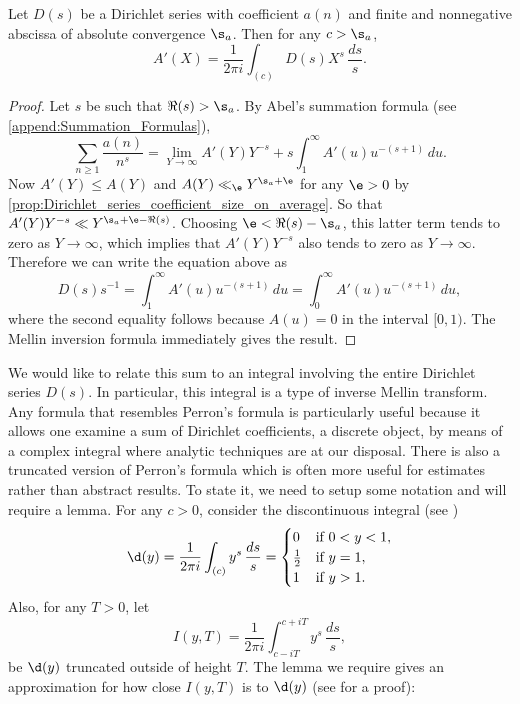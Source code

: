     \begin{theorem}
      Let $D(s)$ be a Dirichlet series with coefficient $a(n)$ and finite and nonnegative abscissa of absolute convergence $\s_{a}$. Then for any $c > \s_{a}$,
      \[
        A'(X) = \frac{1}{2\pi i}\int_{(c)}D(s)X^{s}\,\frac{ds}{s}.
      \]
    \end{theorem}
    \begin{proof}
      Let $s$ be such that $\Re(s) > \s_{a}$. By Abel's summation formula (see \cref{append:Summation_Formulas}),
      \[
        \sum_{n \ge 1}\frac{a(n)}{n^{s}} = \lim_{Y \to \infty}A'(Y)Y^{-s}+s\int_{1}^{\infty}A'(u)u^{-(s+1)}\,du.
      \]
      Now $A'(Y) \le A(Y)$ and $A(Y) \ll_{\e} Y^{\s_{a}+\e}$ for any $\e > 0$ by \cref{prop:Dirichlet_series_coefficient_size_on_average}. So that $A'(Y)Y^{-s} \ll Y^{\s_{a}+\e-\Re(s)}$. Choosing $\e < \Re(s)-\s_{a}$, this latter term tends to zero as $Y \to \infty$, which implies that $A'(Y)Y^{-s}$ also tends to zero as $Y \to \infty$. Therefore we can write the equation above as
      \[
        D(s)s^{-1} = \int_{1}^{\infty}A'(u)u^{-(s+1)}\,du = \int_{0}^{\infty}A'(u)u^{-(s+1)}\,du,
      \]
      where the second equality follows because $A(u) = 0$ in the interval $[0,1)$. The Mellin inversion formula immediately gives the result.
    \end{proof}

    We would like to relate this sum to an integral involving the entire Dirichlet series $D(s)$. In particular, this integral is a type of inverse Mellin transform. Any formula that resembles Perron's formula is particularly useful because it allows one examine a sum of Dirichlet coefficients, a discrete object, by means of a complex integral where analytic techniques are at our disposal. There is also a truncated version of Perron's formula which is often more useful for estimates rather than abstract results. To state it, we need to setup some notation and will require a lemma. For any $c > 0$, consider the discontinuous integral (see \cite{davenport1980multiplicative})
    \[
      \d(y) = \frac{1}{2\pi i}\int_{(c)}y^{s}\,\frac{ds}{s} = \begin{cases} 0 & \text{if $0 < y < 1$}, \\ \frac{1}{2} & \text{if $y = 1$}, \\ 1 & \text{if $y > 1$}. \end{cases}
    \]
    Also, for any $T > 0$, let
    \[
      I(y,T) = \frac{1}{2\pi i}\int_{c-iT}^{c+iT}y^{s}\,\frac{ds}{s},
    \]
    be $\d(y)$ truncated outside of height $T$. The lemma we require gives an approximation for how close $I(y,T)$ is to $\d(y)$ (see \cite{davenport1980multiplicative} for a proof):

